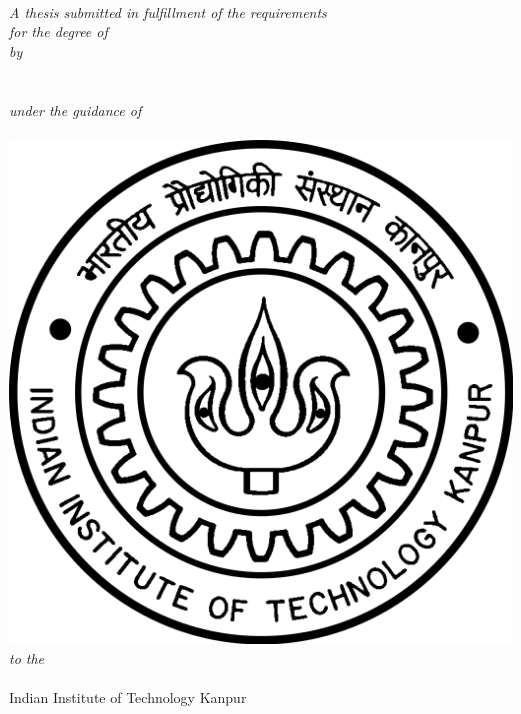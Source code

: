 \begin{titlepage}
	\begin{center}
		\vspace*{0.5cm}
		
		\hrulefill \\
		\Huge
		\textbf{\thesistitle}\\
		\hrulefill \\
		\Large
		\textit{A thesis submitted in fulfillment of the requirements} \\
		\textit{ for the degree of \degreename}\\
		\textit{by}\\
		\textbf{\authorname}\\
		\textbf{\authorrollno}\\
		\textit{under the guidance of}\\
		\supname\\
		\vspace{1.5cm}
		{\includegraphics[scale = 0.1]{images/IITKlogo.png}}\\
		\textit{to the}\\
		\textbf{\deptname}\\
		Indian Institute of Technology Kanpur\\
		\datesubmission\\
		\vspace{1cm}
	
	\end{center}
\end{titlepage}
